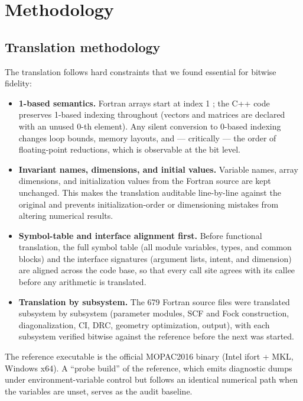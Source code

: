 \documentclass[preprint,12pt]{elsarticle}
\begin{document}
\section{Methodology}\label{sec:method}

\subsection{Translation methodology}\label{sec:method-translation}

The translation follows hard constraints that we found essential for bitwise fidelity:
\begin{itemize}
\item \textbf{1-based semantics.} Fortran arrays start at index 1 \cite{metcalf2018}; the C++ code preserves 1-based indexing throughout (vectors and matrices are declared with an unused 0-th element). Any silent conversion to 0-based indexing changes loop bounds, memory layouts, and --- critically --- the order of floating-point reductions, which is observable at the bit level.
\item \textbf{Invariant names, dimensions, and initial values.} Variable names, array dimensions, and initialization values from the Fortran source are kept unchanged. This makes the translation auditable line-by-line against the original and prevents initialization-order or dimensioning mistakes from altering numerical results.
\item \textbf{Symbol-table and interface alignment first.} Before functional translation, the full symbol table (all module variables, types, and common blocks) and the interface signatures (argument lists, intent, and dimension) are aligned across the code base, so that every call site agrees with its callee before any arithmetic is translated.
\item \textbf{Translation by subsystem.} The 679 Fortran source files were translated subsystem by subsystem (parameter modules, SCF and Fock construction, diagonalization, CI, DRC, geometry optimization, output), with each subsystem verified bitwise against the reference before the next was started.
\end{itemize}

The reference executable is the official MOPAC2016 binary \cite{moussa2026,mopacdoi} (Intel ifort + MKL, Windows x64). A ``probe build'' of the reference, which emits diagnostic dumps under environment-variable control but follows an identical numerical path when the variables are unset, serves as the audit baseline.
\end{document}

